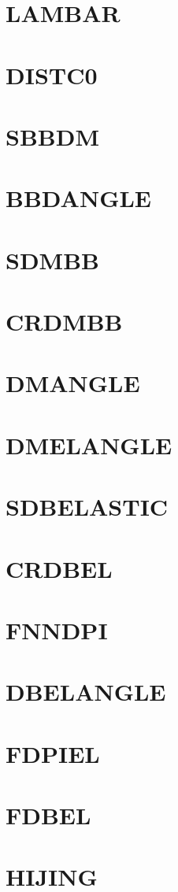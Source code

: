 \documentclass[10pt,UTF8]{ctexbook}
\begin{document}
\section{LAMBAR}
\section{DISTC0}
\section{SBBDM}
\section{BBDANGLE}
\section{SDMBB}
\section{CRDMBB}
\section{DMANGLE}
\section{DMELANGLE}
\section{SDBELASTIC}
\section{CRDBEL}
\section{FNNDPI}
\section{DBELANGLE}
\section{FDPIEL}
\section{FDBEL}
\section{HIJING}
\end{document}
